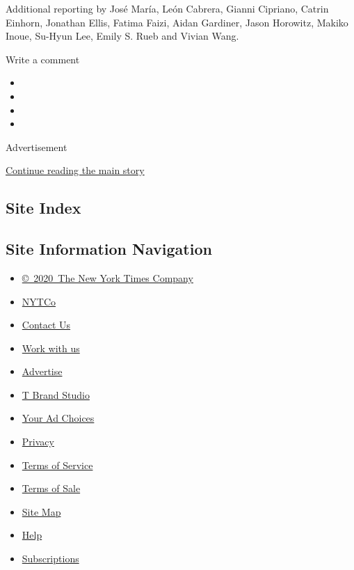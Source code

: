 Additional reporting by José María, León Cabrera, Gianni Cipriano,
Catrin Einhorn, Jonathan Ellis, Fatima Faizi, Aidan Gardiner, Jason
Horowitz, Makiko Inoue, Su-Hyun Lee, Emily S. Rueb and Vivian Wang.

Write a comment

\begin{itemize}
\item
\item
\item
\item
\end{itemize}

Advertisement

\protect\hyperlink{after-bottom}{Continue reading the main story}

\hypertarget{site-index}{%
\subsection{Site Index}\label{site-index}}

\hypertarget{site-information-navigation}{%
\subsection{Site Information
Navigation}\label{site-information-navigation}}

\begin{itemize}
\tightlist
\item
  \href{https://help.nytimes.com/hc/en-us/articles/115014792127-Copyright-notice}{©~2020~The
  New York Times Company}
\end{itemize}

\begin{itemize}
\tightlist
\item
  \href{https://www.nytco.com/}{NYTCo}
\item
  \href{https://help.nytimes.com/hc/en-us/articles/115015385887-Contact-Us}{Contact
  Us}
\item
  \href{https://www.nytco.com/careers/}{Work with us}
\item
  \href{https://nytmediakit.com/}{Advertise}
\item
  \href{http://www.tbrandstudio.com/}{T Brand Studio}
\item
  \href{https://www.nytimes.com/privacy/cookie-policy\#how-do-i-manage-trackers}{Your
  Ad Choices}
\item
  \href{https://www.nytimes.com/privacy}{Privacy}
\item
  \href{https://help.nytimes.com/hc/en-us/articles/115014893428-Terms-of-service}{Terms
  of Service}
\item
  \href{https://help.nytimes.com/hc/en-us/articles/115014893968-Terms-of-sale}{Terms
  of Sale}
\item
  \href{https://spiderbites.nytimes.com}{Site Map}
\item
  \href{https://help.nytimes.com/hc/en-us}{Help}
\item
  \href{https://www.nytimes.com/subscription?campaignId=37WXW}{Subscriptions}
\end{itemize}
